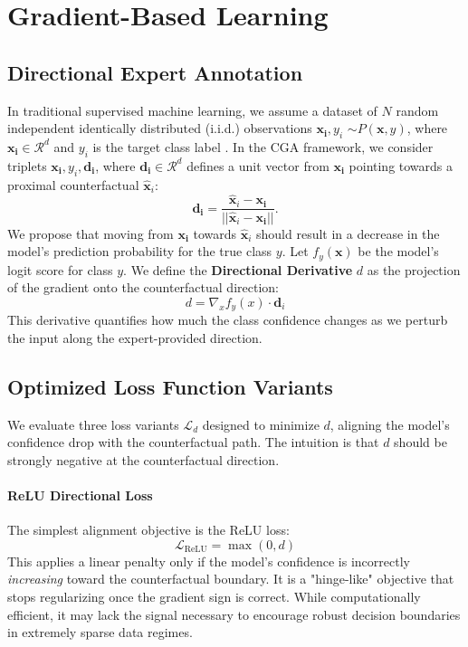 \documentclass[sigconf,anonymous]{aamas}
\begin{document}
\section{Gradient-Based Learning}
\label{sec:gradient_learning}

\subsection{Directional Expert Annotation}
In traditional supervised machine learning, we assume a dataset of $N$ random independent identically distributed (i.i.d.) observations {$\mathbf{x_i}, y_i$} $\sim P(\mathbf{x},y)$, where $\mathbf{x_i}\in\mathcal{R}^d$ and $y_i$ is the target class label \cite{hastie2009elements}. In the CGA framework, we consider triplets {$\mathbf{x_i}, y_i, \mathbf{d_i}$}, where $\mathbf{d_i} \in \mathcal{R}^d$ defines a unit vector from $\mathbf{x_i}$ pointing towards a proximal counterfactual $\hat{\mathbf{x}}_i$: 
\begin{equation}
    \mathbf{d_i}=\frac{\hat{\mathbf{x}}_i - \mathbf{x_i}}{||\hat{\mathbf{x}}_i - \mathbf{x_i}||}. \label{eq:dir_unit}
\end{equation}
We propose that moving from $\mathbf{x_i}$ towards $\hat{\mathbf{x}}_i$ should result in a decrease in the model's prediction probability for the true class $y$. Let $f_y(\mathbf{x})$ be the model's logit score for class $y$. We define the \textbf{Directional Derivative} $d$ as the projection of the gradient onto the counterfactual direction:
\begin{equation}
    d = \nabla_x f_{y}(x) \cdot \mathbf{d}_{i}
\end{equation}
This derivative quantifies how much the class confidence changes as we perturb the input along the expert-provided direction.

\subsection{Optimized Loss Function Variants}
We evaluate three loss variants $\mathcal{L}_{d}$ designed to minimize $d$, aligning the model's confidence drop with the counterfactual path. The intuition is that $d$ should be strongly negative at the counterfactual direction.

\paragraph{ReLU Directional Loss}
The simplest alignment objective is the ReLU loss:
\begin{equation}
    \mathcal{L}_{\text{ReLU}} = \max(0, d)
\end{equation}
This applies a linear penalty only if the model's confidence is incorrectly \emph{increasing} toward the counterfactual boundary. It is a "hinge-like" objective that stops regularizing once the gradient sign is correct. While computationally efficient, it may lack the signal necessary to encourage robust decision boundaries in extremely sparse data regimes.
\end{document}
